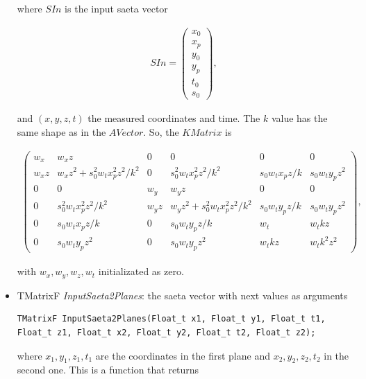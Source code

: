 \documentclass[a4paper]{book}
\begin{document}
\begin{itemize}
	where $SIn$ is the input saeta vector

	\begin{align*}
	SIn = \left(
	\begin{array}{c}
	x_0\\
	x_p\\
	y_0\\
	y_p\\
	t_0\\
	s_0
	\end{array} \right),
	\end{align*}
	
	and $(x, y, z, t)$ the measured coordinates and time. The $k$ value has the same shape as in the $AVector$. So, the $KMatrix$ is
	
	\begin{align*}
	\left(
	\begin{array}{cccccc}
	w_x   & w_x z                             & 0     & 0                        & 0               & 0\\
	w_x z & w_x z^2 + s_0^2 w_t x_p^2 z^2/k^2 & 0     & s_0^2 w_t x_p^2 z^2 /k^2 & s_0 w_t x_p z/k & s_0 w_t y_p z^2 \\
	0     & 0                                 & w_y   & w_y z                    & 0               & 0\\
	0     & s_0^2 w_t x_p^2 z^2 /k^2          & w_y z & w_y z^2 + s_0^2 w_t x_p^2 z^2/k^2 & s_0 w_t y_p z/k & s_0 w_t y_p z^2\\
	0     & s_0 w_t x_p z/k                   & 0     & s_0 w_t y_p z/k          & w_t             & w_t k z\\
	0     & s_0 w_t y_p z^2                   & 0     & s_0 w_t y_p z^2          & w_t k z         & w_t k^2 z^2
	\end{array} \right),
	\end{align*}
	
	with $w_x, w_y, w_z, w_t$ initializated as zero.
	
	\item TMatrixF \textit{InputSaeta2Planes}:  the saeta vector with next values as arguments
	
	\begin{lstlisting}[style=customc]
TMatrixF InputSaeta2Planes(Float_t x1, Float_t y1, Float_t t1, Float_t z1, Float_t x2, Float_t y2, Float_t t2, Float_t z2);
	\end{lstlisting}
	
	where $x_1, y_1, z_1, t_1$ are the coordinates in the first plane and $x_2, y_2, z_2, t_2$ in the second one. This is a function that returns
	

\end{itemize}
\end{document}
